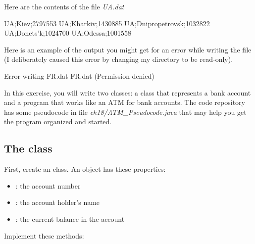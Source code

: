\begin{exercise}
Here are the contents of the file {\em UA.dat}

\begin{stdout}
UA;Kiev;2797553
UA;Kharkiv;1430885
UA;Dnipropetrovsk;1032822
UA;Donets'k;1024700
UA;Odessa;1001558
\end{stdout}

Here is an example of the output you might get for an error while writing the file (I deliberately caused this error by changing my directory to be read-only).

\begin{stdout}
Error writing FR.dat
FR.dat (Permission denied)
\end{stdout}
\end{exercise}

\begin{exercise}
In this exercise, you will write two classes: a class that represents a bank account and a program that works like an ATM for bank accounts. The code repository has some pseudocode in file {\em ch18/ATM\_Pseudocode.java} that may help you get the program organized and started. 

\subsection*{The  class}
First, create an  class. An  object has these properties:

\begin{itemize}
    \item {}: the account number
    \item {}: the account holder's name
    \item {}: the current balance in the account
\end{itemize}

Implement these methods:


\end{exercise}
